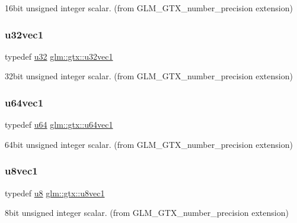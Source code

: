 16bit unsigned integer scalar. (from G\+L\+M\+\_\+\+G\+T\+X\+\_\+number\+\_\+precision extension) 

\mbox{\label{group__gtx__number__precision_gac46a7890b20928df83e734c3ea9557d4}} 
\subsubsection{\texorpdfstring{u32vec1}{u32vec1}}
{\footnotesize\ttfamily typedef \hyperlink{group__gtc__type__precision_ga54e837745059fd29017bed71cfa0a8db}{u32} \hyperlink{group__gtx__number__precision_gac46a7890b20928df83e734c3ea9557d4}{glm\+::gtx\+::u32vec1}}



32bit unsigned integer scalar. (from G\+L\+M\+\_\+\+G\+T\+X\+\_\+number\+\_\+precision extension) 

\mbox{\label{group__gtx__number__precision_ga92812a1d7e746bcaba61d2f5a64afc52}} 
\subsubsection{\texorpdfstring{u64vec1}{u64vec1}}
{\footnotesize\ttfamily typedef \hyperlink{group__gtc__type__precision_ga71cedd4972f9cb1a5e14dfe5ab83ecd7}{u64} \hyperlink{group__gtx__number__precision_ga92812a1d7e746bcaba61d2f5a64afc52}{glm\+::gtx\+::u64vec1}}



64bit unsigned integer scalar. (from G\+L\+M\+\_\+\+G\+T\+X\+\_\+number\+\_\+precision extension) 

\mbox{\label{group__gtx__number__precision_ga35ae7849593a354420e4f52d1b36c2d6}} 
\subsubsection{\texorpdfstring{u8vec1}{u8vec1}}
{\footnotesize\ttfamily typedef \hyperlink{group__gtc__type__precision_ga5e3dc67373d5068997d2d9f41c9024d2}{u8} \hyperlink{group__gtx__number__precision_ga35ae7849593a354420e4f52d1b36c2d6}{glm\+::gtx\+::u8vec1}}



8bit unsigned integer scalar. (from G\+L\+M\+\_\+\+G\+T\+X\+\_\+number\+\_\+precision extension) 

